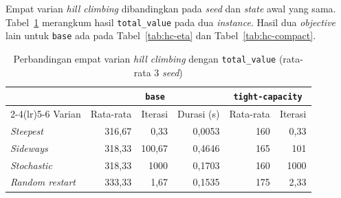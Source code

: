 Empat varian \textit{hill climbing} dibandingkan pada \textit{seed} dan \textit{state} awal yang sama. Tabel~\ref{tab:hc-variants} merangkum hasil \texttt{total\_value} pada dua \textit{instance}. Hasil dua \textit{objective} lain untuk \texttt{base} ada pada Tabel~\ref{tab:hc-eta} dan Tabel~\ref{tab:hc-compact}.

\begin{table}[H]
    \centering
    \small
    \begin{tabular}{@{}lrrrrr@{}}
        \toprule
                                & \multicolumn{3}{c}{\texttt{base}} & \multicolumn{2}{c}{\texttt{tight-capacity}}                                    \\
        \cmidrule(lr){2-4}\cmidrule(lr){5-6}
        Varian                  & Rata-rata                         & Iterasi                                     & Durasi (s) & Rata-rata & Iterasi \\
        \midrule
        \textit{Steepest}       & 316,67                            & 0,33                                        & 0,0053     & 160       & 0,33    \\
        \textit{Sideways}       & 318,33                            & 100,67                                      & 0,4646     & 165       & 101     \\
        \textit{Stochastic}     & 318,33                            & 1000                                        & 0,1703     & 160       & 1000    \\
        \textit{Random restart} & 333,33                            & 1,67                                        & 0,1535     & 175       & 2,33    \\
        \bottomrule
    \end{tabular}
    \caption{Perbandingan empat varian \textit{hill climbing} dengan \texttt{total\_value} (rata-rata 3 \textit{seed})}
    \label{tab:hc-variants}
\end{table}

